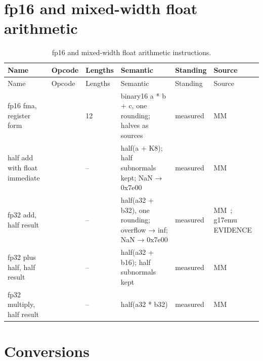 \section{fp16 and mixed-width float arithmetic}\label{sec:fp16-mixed-width-float}

\widetable
\begin{xltabular}{\linewidth}{@{}>{\hsize}Xll>{\hsize}X>{\hsize}X>{\hsize}X@{}}
\caption{fp16 and mixed-width float arithmetic instructions.}\label{tab:scalar-fp16}\\
\toprule
Name & Opcode & Lengths & Semantic & Standing & Source \\
\midrule
\endfirsthead
{}
\toprule
Name & Opcode & Lengths & Semantic & Standing & Source \\
\midrule
\endhead
fp16 fma, register form &  & 12 & binary16 a * b + c, one rounding; halves as sources & measured & MM~ \\*
half add with float immediate &  & – & half(a + K8); half subnormals kept; NaN → 0x7e00 & measured & MM~ \\*
fp32 add, half result &  & – & half(a32 + b32), one rounding; overflow → inf; NaN
→ 0x7e00 & measured & MM~; g17emu EVIDENCE \\*
fp32 plus half, half result &  & – & half(a32 + b16); half subnormals kept & measured & MM~ \\*
fp32 multiply, half result &  & – & half(a32 * b32) & measured & MM~ \\*
\bottomrule
\end{xltabular}

\section{Conversions}\label{sec:conversions-2}

